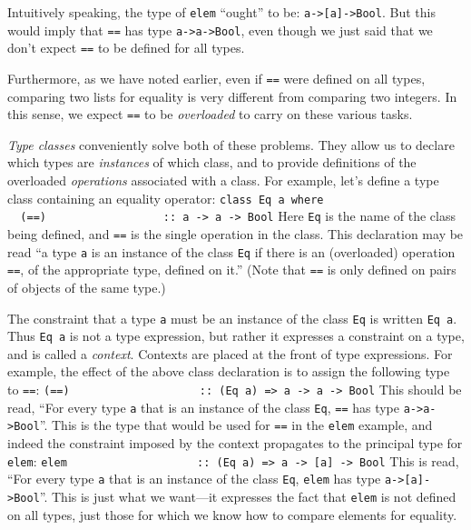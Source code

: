 \noindent Intuitively speaking, the type of \mbox{\tt elem} ``ought'' to be:
\mbox{\tt a->[a]->Bool}.  But this would imply that \mbox{\tt ==} has type \mbox{\tt a->a->Bool},
even though we just said that we don't expect \mbox{\tt ==} to be defined for
all types.

Furthermore, as we have noted earlier, even if \mbox{\tt ==} were 
defined on all types, comparing two lists for equality is very
different from comparing two integers.  In this sense, we expect \mbox{\tt ==}
to be {\em overloaded} to carry on these various tasks.

{\em Type classes} conveniently solve both of these problems.  They
allow us to declare which types are {\em instances} of which class,
and to provide definitions of the overloaded {\em operations}
associated with a class.  For example, let's define a type class
containing an equality operator:
\bprog
\mbox{\tt class\ Eq\ a\ where\ }\\
\mbox{\tt \ \ (==)\ \ \ \ \ \ \ \ \ \ \ \ \ \ \ \ \ \ ::\ a\ ->\ a\ ->\ Bool}
\eprog
Here \mbox{\tt Eq} is the name of the class being defined, and \mbox{\tt ==} is the
single operation in the class.  This declaration may be read ``a type
\mbox{\tt a} is an instance of the class \mbox{\tt Eq} if there is an (overloaded)
operation \mbox{\tt ==}, of the appropriate type, defined on it.''  (Note that
\mbox{\tt ==} is only defined on pairs of objects of the same type.)

The constraint that a type \mbox{\tt a} must be an instance of the class \mbox{\tt Eq}
is written \mbox{\tt Eq\ a}.  Thus \mbox{\tt Eq\ a} is not a type expression, but rather
it expresses a constraint on a type, and is called a {\em context}.
Contexts are placed at the front of type expressions.  For example,
the effect of the above class declaration is to assign the following
type to \mbox{\tt ==}:
\bprog
\mbox{\tt (==)\ \ \ \ \ \ \ \ \ \ \ \ \ \ \ \ \ \ \ \ ::\ (Eq\ a)\ =>\ a\ ->\ a\ ->\ Bool}
\eprog
This should be read, ``For every type \mbox{\tt a} that is an instance of the
class \mbox{\tt Eq}, \mbox{\tt ==} has type \mbox{\tt a->a->Bool}''.  This is the type that would
be used for \mbox{\tt ==} in the \mbox{\tt elem} example, and indeed the constraint
imposed by the context propagates to the principal type for \mbox{\tt elem}:
\bprog
\mbox{\tt elem\ \ \ \ \ \ \ \ \ \ \ \ \ \ \ \ \ \ \ \ ::\ (Eq\ a)\ =>\ a\ ->\ [a]\ ->\ Bool}
\eprog
This is read, ``For every type \mbox{\tt a} that is an instance of the
class \mbox{\tt Eq}, \mbox{\tt elem} has type \mbox{\tt a->[a]->Bool}''.  This is just what we
want---it expresses the fact that \mbox{\tt elem} is not defined on all
types, just those for which we know how to compare elements for
equality.

